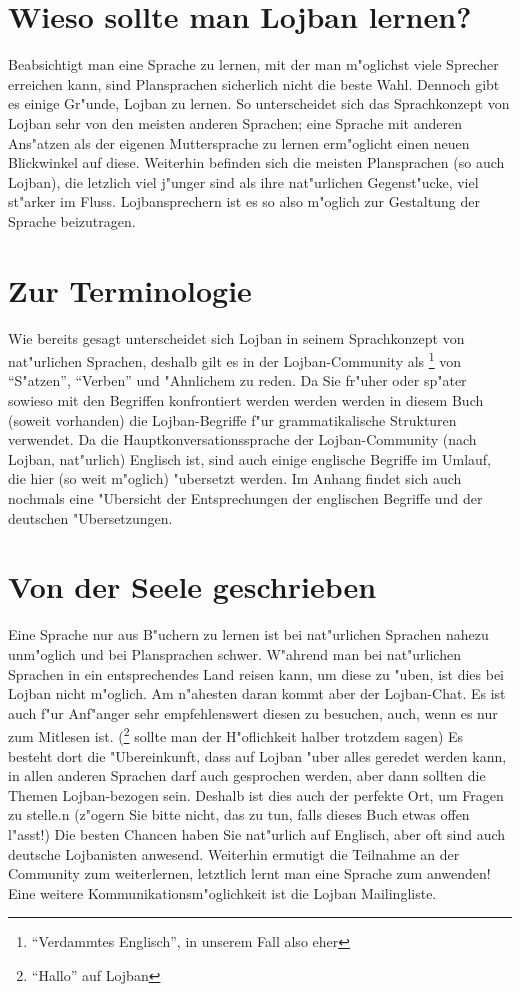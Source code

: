 \section{Wieso sollte man Lojban lernen?}
Beabsichtigt man eine Sprache zu lernen, mit der man m"oglichst viele Sprecher erreichen kann, sind Plansprachen sicherlich nicht die beste Wahl.
Dennoch gibt es einige Gr"unde, Lojban zu lernen. So unterscheidet sich das Sprachkonzept von Lojban sehr von den meisten anderen Sprachen;
eine Sprache mit anderen Ans"atzen als der eigenen Muttersprache zu lernen erm"oglicht einen neuen Blickwinkel auf diese. Weiterhin befinden sich die meisten Plansprachen (so auch Lojban), die letzlich viel j"unger sind als ihre nat"urlichen Gegenst"ucke, viel st"arker im Fluss. Lojbansprechern ist es so also m"oglich zur Gestaltung der Sprache beizutragen.

\section{Zur Terminologie}
Wie bereits gesagt unterscheidet sich Lojban in seinem Sprachkonzept von nat"urlichen Sprachen, deshalb gilt es in der Lojban-Community als \footnote{``Verdammtes Englisch'', in unserem Fall also eher }
von ``S"atzen'', ``Verben'' und "Ahnlichem zu reden. Da Sie fr"uher oder sp"ater sowieso mit den Begriffen konfrontiert werden werden
werden in diesem Buch (soweit vorhanden) die Lojban-Begriffe f"ur grammatikalische Strukturen verwendet. Da die Hauptkonversationssprache der Lojban-Community (nach Lojban, nat"urlich) Englisch ist, sind auch einige englische Begriffe im Umlauf, die hier (so weit m"oglich) "ubersetzt werden. Im Anhang findet sich auch nochmals eine "Ubersicht der Entsprechungen der englischen Begriffe und der deutschen "Ubersetzungen.

\section{Von der Seele geschrieben}
Eine Sprache nur aus B"uchern zu lernen ist bei nat"urlichen Sprachen nahezu unm"oglich und bei Plansprachen schwer. W"ahrend
man bei nat"urlichen Sprachen in ein entsprechendes Land reisen kann, um diese zu "uben, ist dies bei Lojban nicht m"oglich.
Am n"ahesten daran kommt aber der Lojban-Chat. Es ist auch f"ur Anf"anger sehr empfehlenswert diesen zu besuchen, auch, wenn es nur zum Mitlesen ist. (\footnote{``Hallo'' auf Lojban} sollte man der H"oflichkeit halber trotzdem sagen)
Es besteht dort die "Ubereinkunft, dass auf Lojban "uber alles geredet werden kann, in allen anderen Sprachen darf auch gesprochen werden,
aber dann sollten die Themen Lojban-bezogen sein. Deshalb ist dies auch der perfekte Ort, um Fragen zu stelle.n (z"ogern Sie bitte nicht, das zu tun, falls dieses Buch etwas offen l"asst!)
Die besten Chancen haben Sie nat"urlich auf Englisch, aber oft sind auch deutsche Lojbanisten anwesend.
Weiterhin ermutigt die Teilnahme an der Community zum weiterlernen, letztlich lernt man eine Sprache zum anwenden!
Eine weitere Kommunikationsm"oglichkeit ist die Lojban Mailingliste.

